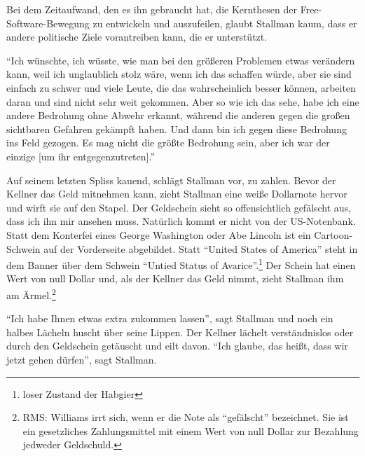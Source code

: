 Bei dem Zeitaufwand, den es ihn gebraucht hat, die Kernthesen der Free-Software-Bewegung zu entwickeln und auszufeilen, glaubt Stallman kaum, dass er andere politische Ziele vorantreiben kann, die er unterstützt.

"`Ich wünschte, ich wüsste, wie man bei den größeren Problemen etwas verändern kann, weil ich unglaublich stolz wäre, wenn ich das schaffen würde, aber sie sind einfach zu schwer und viele Leute, die das wahrscheinlich besser können, arbeiten daran und sind nicht sehr weit gekommen. Aber so wie ich das sehe, habe ich eine andere Bedrohung ohne Abwehr erkannt, während die anderen gegen die großen sichtbaren Gefahren gekämpft haben. Und dann bin ich gegen diese Bedrohung ins Feld gezogen. Es mag nicht die größte Bedrohung sein, aber ich war der einzige [um ihr entgegenzutreten]."'

Auf seinem letzten Spliss kauend, schlägt Stallman vor, zu zahlen. Bevor der Kellner das Geld mitnehmen kann, zieht Stallman eine weiße Dollarnote hervor und wirft sie auf den Stapel. Der Geldschein sieht so offensichtlich gefälscht aus, dass ich ihn mir ansehen muss. Natürlich kommt er nicht von der US-Notenbank. Statt dem Konterfei eines George Washington oder Abe Lincoln ist ein Cartoon-Schwein auf der Vorderseite abgebildet. Statt "`United States of America"' steht in dem Banner über dem Schwein "`Untied Status of Avarice"'.\footnote{loser Zustand der Habgier} Der Schein hat einen Wert von null Dollar und, als der Kellner das Geld nimmt, zieht Stallman ihm am Ärmel.\footnote{RMS: Williams irrt sich, wenn er die Note als "`gefälscht"' bezeichnet. Sie ist ein gesetzliches Zahlungsmittel mit einem Wert von null Dollar zur Bezahlung jedweder Geldschuld. }

"`Ich habe Ihnen etwas extra zukommen lassen"', sagt Stallman und noch ein halbes Lächeln huscht über seine Lippen.
Der Kellner lächelt verständnislos oder durch den Geldschein getäuscht und eilt davon.
"`Ich glaube, das heißt, dass wir jetzt gehen dürfen"', sagt Stallman.
